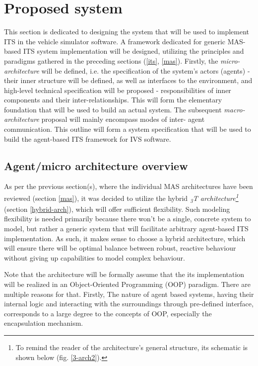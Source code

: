 \documentclass[main.tex]{subfiles}
\begin{document}
    
\section{Proposed system}\label{sec-system}

This section is dedicated to designing the system that will be used to implement ITS in the
vehicle simulator software. A framework dedicated for generic MAS-based ITS system
implementation will be designed, utilizing the principles and paradigms gathered in the
preceding sections (\ref{its}, \ref{mas}). Firstly, the \emph{micro-architecture} will be
defined, i.e. the specification of the system's actors (agents) - their inner structure 
will be defined, as well as interfaces to the environment, and high-level technical specification 
will be proposed - responsibilities of inner components and their inter-relationships.
This will form the elementary foundation that will be used to build an actual system.
The subsequent \emph{macro-architecture} proposal will mainly encompass modes of inter-
agent communication. This outline will form a system specification that will be used 
to build the agent-based ITS framework for IVS software.

\subsection{Agent/micro architecture overview}

As per the previous section(s), where the individual MAS architectures have been reviewed
(section \ref{mas}), it was decided to utilize  the hybrid \emph{\textsubscript{3}T
architecture\footnote{To remind the reader of the architecture's general structure, its
schematic is shown below (fig. \ref{3-arch2}).}} (section \ref{hybrid-arch}), which will offer
sufficient flexibility.  Such modeling flexibility is needed primarily because there won't be a
single, concrete system to model, but rather a generic system that will facilitate arbitrary
agent-based ITS implementation. As such, it makes sense to choose a hybrid architecture, which
will ensure there will be optimal balance between robust, reactive behaviour without giving up
capabilities to model complex behaviour.

Note that the architecture will be formally assume that the its implementation will be realized 
in an Object-Oriented Programming (OOP) paradigm. There are multiple reasons for that. Firstly, 
The nature of agent based systems, having their internal logic and interacting with the surroundings 
through pre-defined interface, corresponds to a large degree to the concepts of OOP, especially
the encapsulation mechanism.
\end{document}
